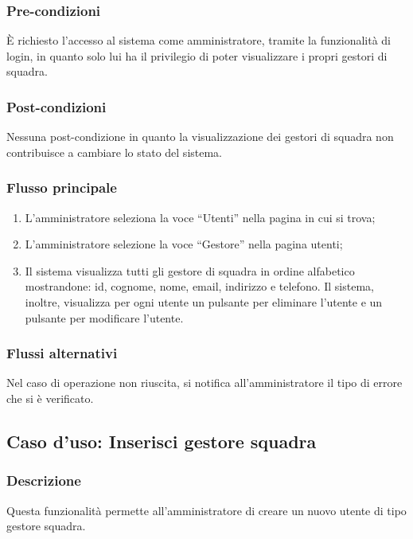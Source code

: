 \subsubsection*{Pre-condizioni}
È richiesto l'accesso al sistema come amministratore, tramite la funzionalità di login, in quanto solo lui ha il privilegio di poter visualizzare i propri gestori di squadra.

\subsubsection*{Post-condizioni}
Nessuna post-condizione in quanto la visualizzazione dei gestori di squadra non contribuisce a cambiare lo stato del sistema.

\subsubsection*{Flusso principale}

\begin{enumerate}
	
	\item
	L'amministratore seleziona la voce ``Utenti'' nella pagina in cui si trova;
	
	\item
	L'amministratore selezione la voce ``Gestore'' nella pagina utenti;
	
	\item
	Il sistema visualizza tutti gli gestore di squadra in ordine alfabetico mostrandone: id, cognome, nome, email, indirizzo e telefono. Il sistema, inoltre, visualizza per ogni utente un pulsante per eliminare l'utente e un pulsante per modificare l'utente.
	
\end{enumerate}

\subsubsection*{Flussi alternativi}
Nel caso di operazione non riuscita, si notifica all'amministratore il tipo di errore che si è verificato.


%
%
\subsection{Caso d'uso: Inserisci gestore squadra}
\label{uc-inserisci-gestore-squadra}

\subsubsection*{Descrizione}
Questa funzionalità permette all'amministratore di creare un nuovo utente di tipo gestore squadra.

